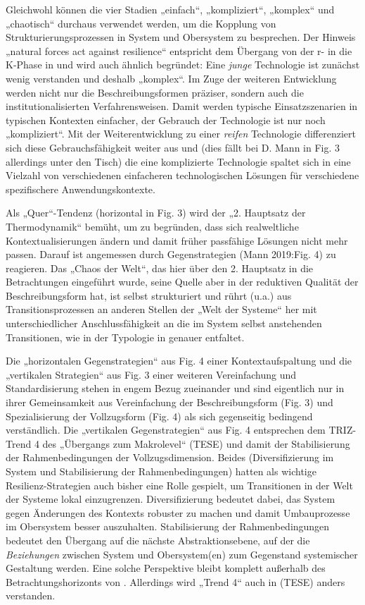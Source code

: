 \documentclass[11pt,a4paper]{article}
\begin{document}
Gleichwohl können die vier Stadien „einfach“, „kompliziert“, „komplex“ und
„chaotisch“ durchaus verwendet werden, um die Kopplung von
Strukturierungsprozessen in System und Obersystem zu besprechen. Der Hinweis
„natural forces act against resilience“ \cite[Fig. 3]{Mann2019} entspricht dem
Übergang von der r- in die K-Phase in \cite{Holling2000} und wird auch ähnlich
begründet: Eine \emph{junge} Technologie ist zunächst wenig verstanden und
deshalb „komplex“. Im Zuge der weiteren Entwicklung werden nicht nur die
Beschreibungsformen präziser, sondern auch die institutionalisierten
Verfahrensweisen. Damit werden typische Einsatzszenarien in typischen
Kontexten einfacher, der Gebrauch der Technologie ist nur noch „kompliziert“.
Mit der Weiterentwicklung zu einer \emph{reifen} Technologie differenziert
sich diese Gebrauchsfähigkeit weiter aus und (dies fällt bei D. Mann in Fig. 3
allerdings unter den Tisch) die eine komplizierte Technologie spaltet sich in
eine Vielzahl von verschiedenen einfacheren technologischen Lösungen für
verschiedene spezifischere Anwendungskontexte.

Als „Quer“-Tendenz (horizontal in Fig. 3) wird der „2. Hauptsatz der
Thermodynamik“ bemüht, um zu begründen, dass sich realweltliche
Kontextualisierungen ändern und damit früher passfähige Lösungen nicht mehr
passen.  Darauf ist angemessen durch Gegenstrategien (Mann 2019:Fig.  4) zu
reagieren. Das „Chaos der Welt“, das hier über den 2. Hauptsatz in die
Betrachtungen eingeführt wurde, seine Quelle aber in der reduktiven Qualität
der Beschreibungsform hat, ist selbst strukturiert und rührt (u.a.) aus
Transitionsprozessen an anderen Stellen der „Welt der Systeme“ her mit
unterschiedlicher Anschlussfähigkeit an die im System selbst anstehenden
Transitionen, wie in der Typologie in \cite{Geels2007} genauer entfaltet.

Die „horizontalen Gegenstrategien“ aus Fig. 4 einer Kontextaufspaltung und die
„vertikalen Strategien“ aus Fig. 3 einer weiteren Vereinfachung und
Standardisierung stehen in engem Bezug zueinander und sind eigentlich nur in
ihrer Gemeinsamkeit aus Vereinfachung der Beschreibungsform (Fig. 3) und
Spezialisierung der Vollzugsform (Fig. 4) als sich gegenseitig bedingend
verständlich. Die „vertikalen Gegenstrategien“ aus Fig. 4 entsprechen dem
TRIZ-Trend 4 des „Übergangs zum Makrolevel“ (TESE) und damit der
Stabilisierung der Rahmenbedingungen der Vollzugsdimension. Beides
(Diversifizierung im System und Stabilisierung der Rahmenbedingungen) hatten
als wichtige Resilienz-Strategien auch bisher eine Rolle gespielt, um
Transitionen in der Welt der Systeme lokal einzugrenzen. Diversifizierung
bedeutet dabei, das System gegen Änderungen des Kontexts robuster zu machen
und damit Umbauprozesse im Obersystem besser auszuhalten. Stabilisierung der
Rahmenbedingungen bedeutet den Übergang auf die nächste Abstraktionsebene, auf
der die \emph{Beziehungen} zwischen System und Obersystem(en) zum Gegenstand
systemischer Gestaltung werden. Eine solche Perspektive bleibt komplett
außerhalb des Betrachtungshorizonts von \cite{Mann2019}. Allerdings wird
„Trend 4“ auch in (TESE) anders verstanden.
\end{document}
